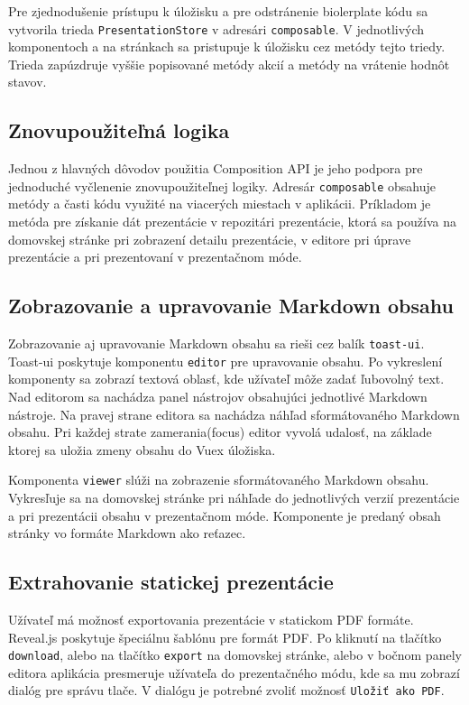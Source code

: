 Pre zjednodušenie prístupu k úložisku a pre odstránenie biolerplate kódu sa vytvorila trieda \texttt{PresentationStore} v adresári \texttt{composable}. V jednotlivých komponentoch a na stránkach sa pristupuje k úložisku cez metódy tejto triedy. Trieda zapúzdruje vyššie popisované metódy akcií a metódy na vrátenie hodnôt stavov.

\subsection{Znovupoužiteľná logika}
Jednou z hlavných dôvodov použitia Composition API je jeho podpora pre jednoduché vyčlenenie znovupoužiteľnej logiky. Adresár \texttt{composable} obsahuje metódy a časti kódu využité na viacerých miestach v aplikácii. Príkladom je metóda pre získanie dát prezentácie v repozitári prezentácie, ktorá sa používa na domovskej stránke pri zobrazení detailu prezentácie, v editore pri úprave prezentácie a pri prezentovaní v prezentačnom móde. 

\subsection{Zobrazovanie a upravovanie Markdown obsahu}
Zobrazovanie aj upravovanie Markdown obsahu sa rieši cez balík \texttt{toast-ui}. Toast-ui poskytuje komponentu \texttt{editor} pre upravovanie obsahu. Po vykreslení komponenty sa zobrazí textová oblasť, kde užívateľ môže zadať ľubovolný text. Nad editorom sa nachádza panel nástrojov obsahujúci jednotlivé Markdown nástroje. Na pravej strane editora sa nachádza náhľad sformátovaného Markdown obsahu. Pri každej strate zamerania(focus) editor vyvolá udalosť, na základe ktorej sa uložia zmeny obsahu do Vuex úložiska. 

Komponenta \texttt{viewer} slúži na zobrazenie sformátovaného Markdown obsahu. Vykresľuje sa na domovskej stránke pri náhľade do jednotlivých verzií prezentácie a pri prezentácii obsahu v prezentačnom móde. Komponente je predaný obsah stránky vo formáte Markdown ako reťazec.

\subsection{Extrahovanie statickej prezentácie}
Užívateľ má možnosť exportovania prezentácie v statickom PDF formáte. Reveal.js poskytuje špeciálnu šablónu pre formát PDF. Po kliknutí na tlačítko \texttt{download}, alebo na tlačítko \texttt{export} na domovskej stránke, alebo v bočnom panely editora aplikácia presmeruje užívateľa do prezentačného módu, kde sa mu zobrazí dialóg pre správu tlače. V dialógu je potrebné zvoliť možnosť \texttt{Uložiť ako PDF}.


